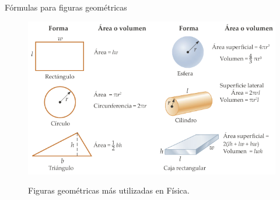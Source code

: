 \begin{frame}{Fórmulas para figuras geométricas}
    \begin{figure}
        \centering
        \includegraphics[width=0.90\linewidth]{figures/figuras_geo.pdf}
        \label{fig:figuras_geometricas}
        \caption{Figuras geométricas más utilizadas en Física. \cite{Serway-2018}}
    \end{figure}
\end{frame}
